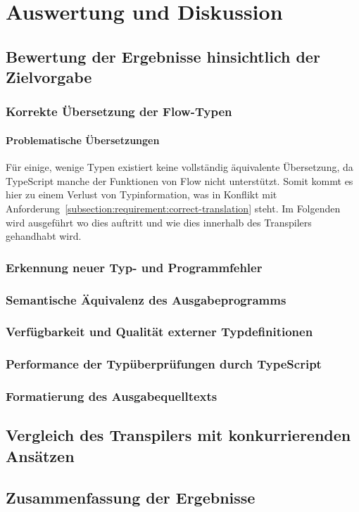 \chapter{Auswertung und Diskussion}
\label{chap:evaluation}


\section{Bewertung der Ergebnisse hinsichtlich der Zielvorgabe}

\subsection{Korrekte Übersetzung der Flow-Typen}

\subsubsection{Problematische Übersetzungen}

Für einige, wenige Typen existiert keine vollständig äquivalente Übersetzung, da TypeScript manche der Funktionen von Flow nicht unterstützt. Somit kommt es hier zu einem Verlust von Typinformation, was in Konflikt mit Anforderung~\ref{subsection:requirement:correct-translation} steht. Im Folgenden wird ausgeführt wo dies auftritt und wie dies innerhalb des Transpilers gehandhabt wird.

\subsection{Erkennung neuer Typ- und Programmfehler}

\subsection{Semantische Äquivalenz des Ausgabeprogramms}

\subsection{Verfügbarkeit und Qualität externer Typdefinitionen}

\subsection{Performance der Typüberprüfungen durch TypeScript}

\subsection{Formatierung des Ausgabequelltexts}

\section{Vergleich des Transpilers mit konkurrierenden Ansätzen}

\section{Zusammenfassung der Ergebnisse}
